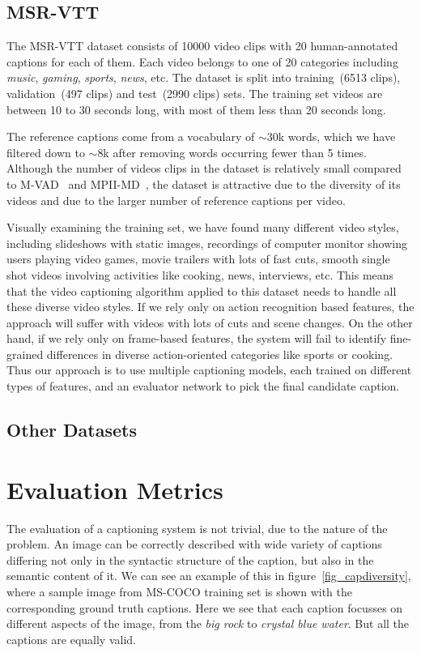 \subsection{MSR-VTT}
The MSR-VTT dataset consists of 10000 video clips with 20
human-annotated captions for each of them.
Each video belongs to one of 20 categories including \emph{music},
\emph{gaming}, \emph{sports}, \emph{news}, etc.
The dataset is split into training~(6513 clips), validation~(497
clips) and test~(2990 clips) sets. 
The training set videos are between 10 to 30 seconds long, with most
of them less than 20 seconds long.

The reference captions come from a vocabulary of $\sim$30k words,
which we have filtered down to $\sim$8k after removing words occurring
fewer than 5 times.
Although the number of videos clips in the dataset is relatively small
compared to M-VAD~\cite{rohrbach15cvpr} and
MPII-MD~\cite{AtorabiM-VAD2015}, the dataset is attractive due to the
diversity of its videos and due to the larger number of reference
captions per video.

Visually examining the training set, we have found many different
video styles, including slideshows with static images, recordings of
computer monitor showing users playing video games, movie trailers
with lots of fast cuts, smooth single shot videos involving
activities like cooking, news, interviews, etc.
This means that the video captioning algorithm applied to this dataset
needs to handle all these diverse video styles.
If we rely only on action recognition based features, the approach
will suffer with videos with lots of cuts and scene changes.
On the other hand, if we rely only on frame-based features, the system
will fail to identify fine-grained differences in diverse
action-oriented categories like sports or cooking.
Thus our approach is to use multiple captioning models, each trained
on different types of features, and an evaluator network to pick the
final candidate caption.
\subsection{Other Datasets}
\section{Evaluation Metrics}
The evaluation of a captioning system is not trivial, due to the
 nature of the problem.
An image can be correctly described with wide variety of captions differing not
only in the syntactic structure of the caption, but also in the semantic content
of it.
We can see an example of this in figure~\ref{fig_capdiversity}, where a sample
image from MS-COCO training set is shown with the corresponding ground truth
captions.
Here we see that each caption focusses on different aspects of the image, from
the \emph{big rock} to \emph{crystal blue water}.
But all the captions are equally valid.

